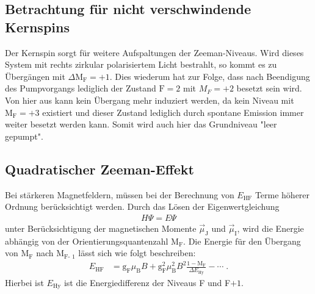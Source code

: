 \subsection{Betrachtung für nicht verschwindende Kernspins}
Der Kernspin sorgt für weitere Aufspaltungen der Zeeman-Niveaus.
Wird dieses System mit rechts zirkular polarisiertem Licht bestrahlt, so kommt
es zu Übergängen mit $\Delta \text{M}_{\text{F}} = +1$.
Dies wiederum hat zur Folge, dass nach Beendigung des Pumpvorgangs lediglich der Zustand $\text{F}=2$ mit $M_F=+2$ besetzt sein wird. Von hier aus kann kein Übergang mehr induziert werden, da kein Niveau mit $\text{M}_{\text{F}}=+3$ existiert und dieser Zustand lediglich durch spontane Emission immer weiter besetzt werden kann.
Somit wird auch hier das Grundniveau "leer gepumpt".

\subsection{Quadratischer Zeeman-Effekt}
Bei stärkeren Magnetfeldern, müssen bei der Berechnung von $E_{\text{HF}}$ Terme höherer Ordnung berücksichtigt werden.
Durch das Lösen der Eigenwertgleichung
\begin{align*}
    H \Psi = E \Psi
\end{align*}
unter Berücksichtigung der magnetischen Momente $\vec{\mu}_{\text{J}}$ und $\vec{\mu}_{\text{I}}$, wird die
Energie abhängig von
der  Orientierungsquantenzahl $\text{M}_{\text{F}}$. Die Energie für den Übergang von $\text{M}_{\text{F}}$
nach $\text{M}_{\text{F-
1}}$ lässt sich wie folgt beschreiben:
\begin{align}
  \label{eq_qZeeman}
    E_{\text{HF}} &= \text{g}_{\text{F}} \mu_{\text{B}} B+ \text{g}_{\text{F}}^2 \mu_{\text{B}}^2 B^2
    \frac{1- \text{M}_{\text{F}}}{\Delta E_{\text{Hy}}}- \cdots  \; .
\end{align}
Hierbei ist $E_{\text{Hy}}$ ist die Energiedifferenz der Niveaus F und F$+1$.
\newpage
